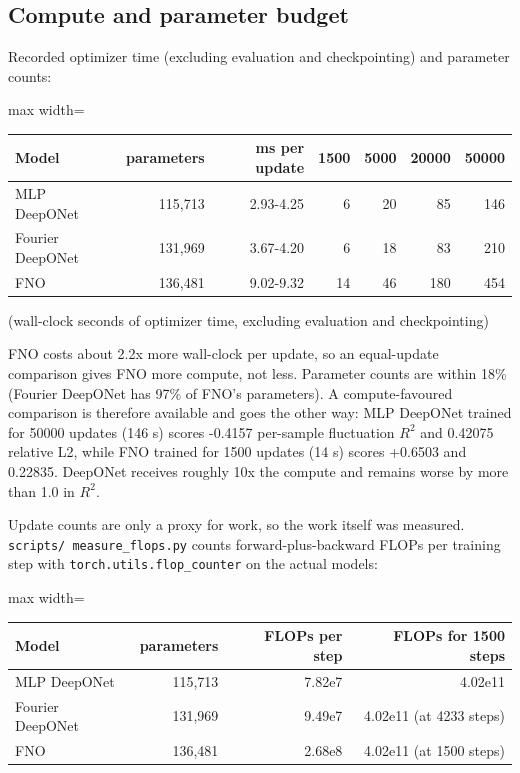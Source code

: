 \documentclass[preprint,12pt]{elsarticle}
\begin{document}
\subsection{Compute and parameter budget}

Recorded optimizer time (excluding evaluation and checkpointing) and parameter counts:

\begin{center}
\begin{adjustbox}{max width=\linewidth}
\small
\begin{tabular}{lrrrrrr}
\toprule
Model & parameters & ms per update & 1500 & 5000 & 20000 & 50000 \\
\midrule
MLP DeepONet & 115,713 & 2.93-4.25 & 6 & 20 & 85 & 146 \\
Fourier DeepONet & 131,969 & 3.67-4.20 & 6 & 18 & 83 & 210 \\
FNO & 136,481 & 9.02-9.32 & 14 & 46 & 180 & 454 \\
\bottomrule
\end{tabular}
\end{adjustbox}
\end{center}


(wall-clock seconds of optimizer time, excluding evaluation and checkpointing)

FNO costs about 2.2x more wall-clock per update, so an equal-update comparison gives FNO more compute, not less. Parameter counts are within 18\% (Fourier DeepONet has 97\% of FNO's parameters). A compute-favoured comparison is therefore available and goes the other way: MLP DeepONet trained for 50000 updates (146 s) scores -0.4157 per-sample fluctuation $R^2$ and 0.42075 relative L2, while FNO trained for 1500 updates (14 s) scores +0.6503 and 0.22835. DeepONet receives roughly 10x the compute and remains worse by more than 1.0 in $R^2$.

Update counts are only a proxy for work, so the work itself was measured. \texttt{scripts/
measure\_flops.py} counts forward-plus-backward FLOPs per training step with \texttt{torch.utils.flop\_counter} on the actual models:

\begin{center}
\begin{adjustbox}{max width=\linewidth}
\small
\begin{tabular}{lrrr}
\toprule
Model & parameters & FLOPs per step & FLOPs for 1500 steps \\
\midrule
MLP DeepONet & 115,713 & 7.82e7 & 4.02e11 \\
Fourier DeepONet & 131,969 & 9.49e7 & 4.02e11 (at 4233 steps) \\
FNO & 136,481 & 2.68e8 & 4.02e11 (at 1500 steps) \\
\bottomrule
\end{tabular}
\end{adjustbox}
\end{center}
\end{document}
